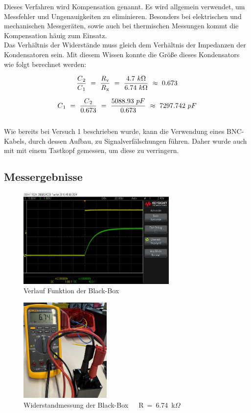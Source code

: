 \documentclass[a4paper,12pt]{article}
\begin{document}
\noindent Dieses Verfahren wird Kompensation genannt. Es wird allgemein verwendet, um Messfehler und Ungenauigkeiten zu eliminieren. Besonders bei elektrischen und mechanischen Messgeräten, sowie auch bei thermischen Messungen kommt die Kompensation häuig zum Einsatz.\\


\noindent Das Verhältnis der Widerstände muss gleich dem Verhältnis der Impedanzen der Kondensatoren sein. Mit diesem Wissen konnte die Größe dieses Kondensators wie folgt berechnet werden:

\[
\frac{C\textsubscript{2}}{C\textsubscript{1}}~=~\frac{R\textsubscript{v}}{R\textsubscript{x}}~=~\frac{4.7~k\Omega}{6.74~k\Omega}~\approx~0.673\]

\[
C\textsubscript{1}~=~\frac{C\textsubscript{2}}{0.673}~=~\frac{5088.93~pF}{0.673}~\approx~7297.742~pF
\]\\



\noindent Wie bereits bei Versuch 1 beschrieben wurde, kann die Verwendung eines BNC-Kabels, durch dessen Aufbau, zu Signalverfälschungen führen. Daher wurde auch mit mit einem Tastkopf gemessen, um diese zu verringern.


\subsection{Messergebnisse}
\begin{figure}[H]
    \centering
    \includegraphics[width=0.7\textwidth]{../Quellen/Labor2/scope_3.png}
\caption{Verlauf Funktion der Black-Box}
\end{figure}



\begin{figure}[H]
    \centering
    \includegraphics[width=0.4\textwidth]{../Quellen/Labor2/Fotos/IMG_3973gezoomt.jpeg}
\caption{Widerstandmessung der Black-Box~~~R~=~6.74~k$\Omega$}
\end{figure}
\end{document}

